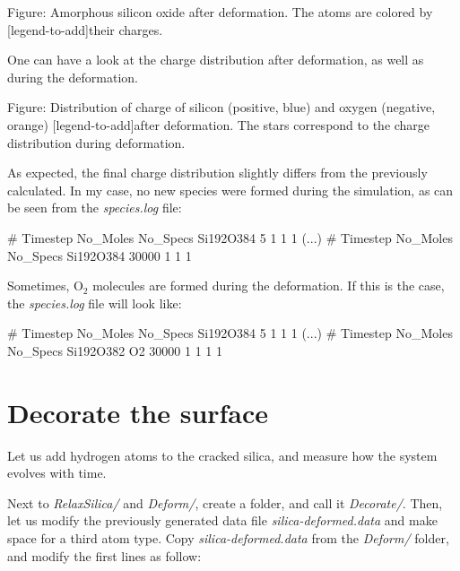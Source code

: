 \vspace{0.25cm} Figure: Amorphous silicon oxide after deformation. The atoms are colored by
[legend-to-add]their charges.

\vspace{0.25cm} \noindent One can have a look at the charge distribution after deformation,
as well as during the deformation.

\vspace{0.25cm} Figure: Distribution of charge of silicon (positive, blue) and oxygen (negative, orange)
[legend-to-add]after deformation. The stars correspond to the charge distribution during deformation. 

\vspace{0.25cm} \noindent As expected, the final charge distribution slightly differs from the
previously calculated. In my case, no new species were formed during the
simulation, as can be seen from the \textit{species.log} file:

\begin{lcverbatim}
#  Timestep    No_Moles    No_Specs   Si192O384
        5           1           1           1
(...)
#  Timestep    No_Moles    No_Specs   Si192O384
    30000           1           1           1
\end{lcverbatim}

\noindent Sometimes, $\text{O}_2$ molecules are formed during the
deformation. If this is the case, the \textit{species.log} file will look like:

\begin{lcverbatim}
#  Timestep    No_Moles    No_Specs   Si192O384
          5           1           1           1
(...)
#  Timestep    No_Moles    No_Specs   Si192O382          O2
      30000           1           1           1           1
\end{lcverbatim}

\noindent \section{Decorate the surface}
Let us add hydrogen atoms to the cracked silica, and measure how the system
evolves with time. 

\vspace{0.25cm} \noindent Next to \textit{RelaxSilica/} and \textit{Deform/}, create a folder, and call it \textit{Decorate/}.
Then, let us modify the previously generated data file
\textit{silica-deformed.data} and make space for a third atom type.
Copy \textit{silica-deformed.data} from the \textit{Deform/} folder,
and modify the first lines as follow:


